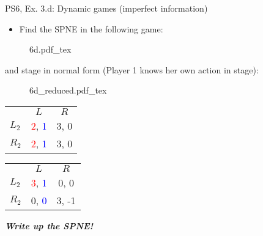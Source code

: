 \begin{frame}{PS6, Ex. 3.d: Dynamic games (imperfect information)}
    \begin{itemize}
      \item[(d)] Find the SPNE in the following game:
    \end{itemize}
    \vspace{-4pt}
    \begin{figure}[!h]
      \center
      \def\svgwidth{.8\columnwidth}
      {6d.pdf_tex}
    \end{figure}
    \vspace{-4pt}
     and  stage in normal form (Player 1 knows her own action in  stage):
    \vspace{-4pt}
    \begin{figure}[!h]
      \center
      \def\svgwidth{.25\columnwidth}
      {6d_reduced.pdf_tex}
    \end{figure}
    \vspace{-9pt}
    \begin{table}
      \begin{tabular}{l|c|c|}
        \multicolumn{1}{c}{} & \multicolumn{1}{c}{\color{blue}$L$} & \multicolumn{1}{c}{$R$} \\\cline{2-3}
        $L_2$ & \textcolor{red}{2}, \textcolor{blue}{1} & 3, 0 \\\cline{2-3}
        $R_2$ & \textcolor{red}{2}, \textcolor{blue}{1} & 3, 0 \\\cline{2-3}
      \end{tabular}
      \enskip
      \begin{tabular}{l|c|c|}
        \multicolumn{1}{c}{} & \multicolumn{1}{c}{\color{blue}$L$} & \multicolumn{1}{c}{$R$} \\\cline{2-3}
        $L_2$ & \textcolor{red}{3}, \textcolor{blue}{1} & 0, 0 \\\cline{2-3}
        $R_2$ & 0, \textcolor{blue}{0} & 3, -1 \\\cline{2-3}
      \end{tabular}
    \end{table}
    \vspace{-4pt}
    \textbf{\textit{Write up the SPNE!}}
    \vfill\null
\end{frame}
